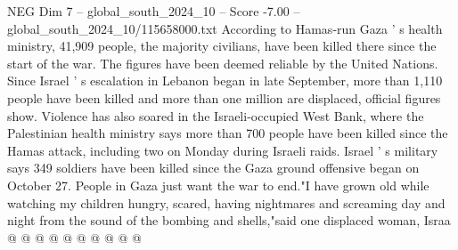 \begin{textsample}{NEG Dim 7 – global\_south\_2024\_10 – Score -7.00 – global\_south\_2024\_10/115658000.txt}
According to Hamas-run Gaza ' s health ministry, 41,909 people, the majority civilians, have been killed there since the start of the war.
The figures have been deemed reliable by the United Nations.
Since Israel ' s escalation in Lebanon began in late September, more than 1,110 people have been killed and more than one million are displaced, official figures show.
Violence has also soared in the Israeli-occupied West Bank, where the Palestinian health ministry says more than 700 people have been killed since the Hamas attack, including two on Monday during Israeli raids.
Israel ' s military says 349 soldiers have been killed since the Gaza ground offensive began on October 27.
People in Gaza just want the war to end."I have grown old while watching my children hungry, scared, having nightmares and screaming day and night from the sound of the bombing and shells,"said one displaced woman, Israa @ @ @ @ @ @ @ @ @ @

\end{textsample}
